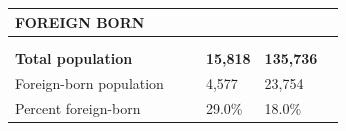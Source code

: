 \documentclass[9pt]{report}
\begin{document}
\newpage
\setlength{\tabcolsep}{.01in} %
\begin{tabular}{p{.10in}p{.10in}p{.10in}p{3.7in}>{\hfill}p{.85in}>{\hfill}p{.85in}>{\hfill}p{.85in}>{\hfill}p{.85in}p{0.1in}}
\multicolumn{9}{l}{\parbox{7.1in}{\raggedright{\large{\strut\textbf{FOREIGN BORN}\strut}}}} \\ 
\hline
\multicolumn{4}{l}{\parbox{3.5in}{\raggedright{\textbf{}}}} & \multicolumn{1}{r}{\parbox{.85in}{\strut\raggedleft{\textbf{}\strut}}} & \multicolumn{1}{r}{\parbox{.85in}{\strut\raggedleft{\textbf{}\strut}}} & \multicolumn{1}{r}{\parbox{.85in}{\strut{}}} & \multicolumn{1}{r}{\parbox{.85in}{\strut{}}} & \\ 
\multicolumn{9}{l}{} \\ 
\multicolumn{4}{l}{\parbox{3.5in}{\strut\raggedright{\textbf{Total population}\strut}}} & \textbf{} & \textbf{} & \textbf{15,818} & \textbf{135,736} & \textbf{} \\ 
\multicolumn{4}{l}{\parbox{3.6in}{\strut\raggedright{{Foreign-born population}}\strut}} &  &  & 4,577 & 23,754 & \multicolumn{1}{l}{}  \\ 
\multicolumn{4}{l}{\parbox{3.6in}{\strut\raggedright{{Percent foreign-born}}\strut}} &  &  & 29.0\% & 18.0\% & \multicolumn{1}{l}{}  \\ 

\end{tabular}
\setlength{\tabcolsep}{6pt} %
\end{document}
